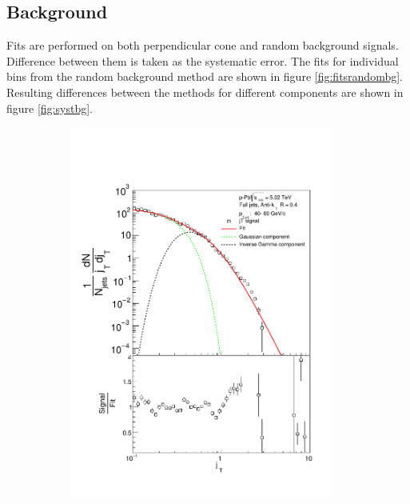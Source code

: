   \subsection{Background}
 Fits are performed on both perpendicular cone and random background signals. Difference between them is taken as the systematic error. The fits for individual bins from the random background method are shown in figure \ref{fig:fitsrandombg}. Resulting differences between the methods for different components are shown in figure \ref{fig:systbg}.




\begin{figure}
\centering
\begin{subfigure}{0.24\textwidth}
\includegraphics[width=0.95\textwidth]{results/JetConejTSignalFit/JetConejTSignalFitNFin00JetPt04randomBgBayes}
\end{subfigure}
\begin{subfigure}{0.24\textwidth}

\end{subfigure}
\end{figure}
